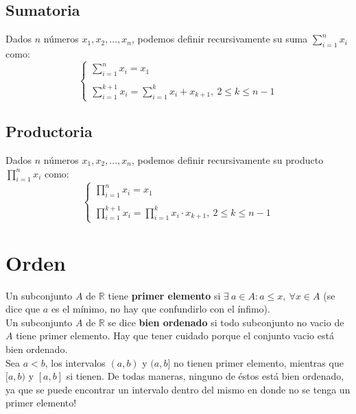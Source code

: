 \documentclass[11pt,a4paper]{article}
\begin{document}
\subsection{Sumatoria}
\noindent Dados $n$ n\'umeros $x_1, x_2, ..., x_n$, podemos definir recursivamente su suma $\displaystyle{\sum_{i=1}^n}x_i$ como: 
$$\left\{\begin{array}{l}
\sum_{i=1}^nx_i = x_1\\ \\
\sum_{i=1}^{k+1}x_i = \sum_{i=1}^{k}x_i + x_{k+1},\ 2\leq k \leq n-1
\end{array}\right.$$

\subsection{Productoria}
\noindent Dados $n$ n\'umeros $x_1, x_2, ..., x_n$, podemos definir recursivamente su producto $\displaystyle{\prod_{i=1}^n}x_i$ como: 
$$\left\{\begin{array}{l}
\prod_{i=1}^nx_i = x_1\\ \\
\prod_{i=1}^{k+1}x_i = \prod_{i=1}^{k}x_i \cdot x_{k+1},\ 2\leq k \leq n-1
\end{array}\right.$$

\section{Orden}
\noindent Un subconjunto $A$ de $\mathbb{R}$ tiene \textbf{primer elemento} si $\exists\ a \in A : a \leq x,\ \forall x \in A$ (se dice que $a$ es el m\'inimo, no hay que confundirlo con el \'infimo).\\
\noindent Un subconjunto $A$ de $\mathbb{R}$ se dice \textbf{bien ordenado} si todo subconjunto no vacio de $A$ tiene primer elemento. Hay que tener cuidado porque el conjunto vacio est\'a bien ordenado.\\

\noindent Sea $a<b$, los intervalos $(a,b)$ y $(a,b]$ no tienen primer elemento, mientras que $[a,b)$ y $[a,b]$ si tienen. De todas maneras, ninguno de \'estos est\'a bien ordenado, ya que se puede encontrar un intervalo dentro del mismo en donde no se tenga un primer elemento!\\
\end{document}
